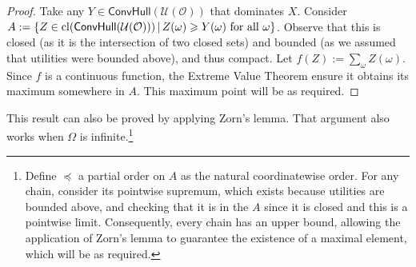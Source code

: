 \documentclass[a4paper,final]{article}
\newcommand\cl{\mathrm{cl}}
\renewcommand\O{\mathcal{O}}
\newcommand\Uwald{\mathcal{U}} %
\newcommand{\Conv}{\mathsf{ConvHull}}
\newcommand\SetDelimiter[1][]{
	\nonscript\,#1\vert \allowbreak \nonscript\,\mathopen{}}
\providecommand\given{\SetDelimiter}
\renewcommand{\geq}{\geqslant}
\newenvironment{CCM rewritten}
{\begingroup\color{blue}} %
{\endgroup}              %
\begin{document}
	
	\begin{proof}
		Take any $Y\in \Conv(\Uwald(\O))$ that dominates $X$. Consider $A:=\{Z\in \cl(\Conv(\Uwald(\O)))\given  Z(\omega)\geq Y(\omega)\text{ for all $\omega$}\}$. Observe that this is closed (as it is the intersection of two closed sets) and bounded (as we assumed that utilities were bounded above), and thus compact. Let $f(Z):=\sum_\omega Z(\omega)$. Since $f$ is a continuous function, the Extreme Value Theorem ensure it obtains its maximum somewhere in $A$. This maximum point will be as required. 
	\end{proof}
	
	This result can also be proved by applying Zorn's lemma. That argument also works when $\Omega$ is infinite.\footnote{Define $\preccurlyeq$ a partial order on $A$ as the natural coordinatewise order. For any chain, consider its pointwise supremum, which exists because utilities are bounded above, and checking that it is in the $A$ since it is closed and this is a pointwise limit. Consequently, every chain has an upper bound, allowing the application of Zorn's lemma to guarantee the existence of a maximal element, which will be as required. } 
	
\end{document}
